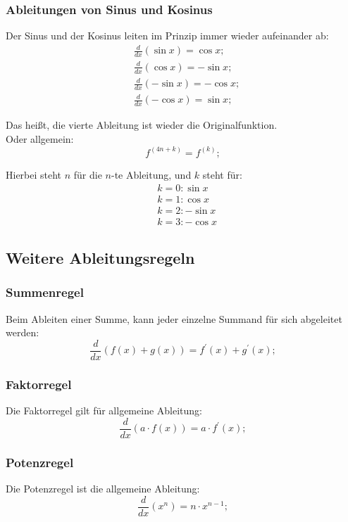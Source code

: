 \documentclass[a4paper]{article}
\begin{document}
\subsubsection{Ableitungen von Sinus und Kosinus}
Der Sinus und der Kosinus leiten im Prinzip immer wieder aufeinander ab:
\begin{align*}
	& \frac{d}{dx} \left( \sin{x} \right) = \cos{x} ;
	\\
	& \frac{d}{dx} \left( \cos{x} \right) = -\sin{x} ;
	\\
	& \frac{d}{dx} \left( -\sin{x} \right) = -\cos{x} ;
	\\
	& \frac{d}{dx} \left( -\cos{x} \right) = \sin{x} ;
\end{align*}

Das heißt, die vierte Ableitung ist wieder die Originalfunktion.\\
Oder allgemein:
\[
	f^{(4n + k)} = f^{(k)} ;
\]

Hierbei steht $n$ für die $n$-te Ableitung, und $k$ steht für:
\begin{align*}
	& k = 0: \sin{x}
	\\
	& k = 1: \cos{x}
	\\
	& k = 2: -\sin{x}
	\\
	& k = 3: -\cos{x}
\end{align*}

\subsection{Weitere Ableitungsregeln}

\subsubsection{Summenregel}
Beim Ableiten einer Summe, kann jeder einzelne Summand für sich abgeleitet werden:
\[
	\frac{d}{dx} \left( f(x) + g(x) \right) = f^\prime(x) + g^\prime(x) ;
\]

\subsubsection{Faktorregel}
Die Faktorregel gilt für allgemeine Ableitung:
\[
	\frac{d}{dx} \left( a \cdot f(x) \right) = a \cdot f^\prime(x);
\]

\subsubsection{Potenzregel}
Die Potenzregel ist die allgemeine Ableitung:
\[
	\frac{d}{dx} \left( x^n \right) = n \cdot x^{n - 1} ;
\]
\end{document}
